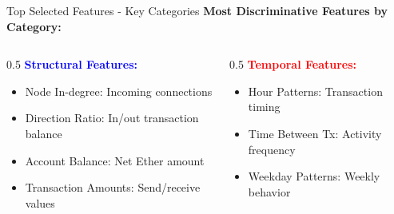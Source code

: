 \documentclass{beamer}
\begin{document}
\begin{frame}{Top Selected Features - Key Categories}
    \textbf{Most Discriminative Features by Category:}
    
    \vspace{0.4cm}
    \begin{columns}
        \begin{column}{0.5\textwidth}
            \textbf{\textcolor{blue}{Structural Features:}}
            \begin{itemize}
                \item Node In-degree: Incoming connections
                \item Direction Ratio: In/out transaction balance
                \item Account Balance: Net Ether amount
                \item Transaction Amounts: Send/receive values
            \end{itemize}
        \end{column}
        \begin{column}{0.5\textwidth}
            \textbf{\textcolor{red}{Temporal Features:}}
            \begin{itemize}
                \item Hour Patterns: Transaction timing
                \item Time Between Tx: Activity frequency
                \item Weekday Patterns: Weekly behavior
            \end{itemize}
        \end{column}
    \end{columns}
    
    \vspace{0.4cm}
\end{frame}
\end{document}
